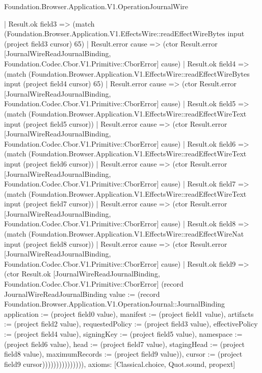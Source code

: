 \begin{lexlean}{Foundation.Browser.Application.V1.OperationJournalWire}
\begin{semanticmodule}
{              | Result.ok field3 => (match (Foundation.Browser.Application.V1.EffectsWire::readEffectWireBytes input (project field3 cursor) 65)
                | Result.error cause => (ctor Result.error [JournalWireReadJournalBinding, Foundation.Codec.Cbor.V1.Primitive::CborError] cause)
                | Result.ok field4 => (match (Foundation.Browser.Application.V1.EffectsWire::readEffectWireBytes input (project field4 cursor) 65)
                  | Result.error cause => (ctor Result.error [JournalWireReadJournalBinding, Foundation.Codec.Cbor.V1.Primitive::CborError] cause)
                  | Result.ok field5 => (match (Foundation.Browser.Application.V1.EffectsWire::readEffectWireText input (project field5 cursor))
                    | Result.error cause => (ctor Result.error [JournalWireReadJournalBinding, Foundation.Codec.Cbor.V1.Primitive::CborError] cause)
                    | Result.ok field6 => (match (Foundation.Browser.Application.V1.EffectsWire::readEffectWireText input (project field6 cursor))
                      | Result.error cause => (ctor Result.error [JournalWireReadJournalBinding, Foundation.Codec.Cbor.V1.Primitive::CborError] cause)
                      | Result.ok field7 => (match (Foundation.Browser.Application.V1.EffectsWire::readEffectWireText input (project field7 cursor))
                        | Result.error cause => (ctor Result.error [JournalWireReadJournalBinding, Foundation.Codec.Cbor.V1.Primitive::CborError] cause)
                        | Result.ok field8 => (match (Foundation.Browser.Application.V1.EffectsWire::readEffectWireNat input (project field8 cursor))
                          | Result.error cause => (ctor Result.error [JournalWireReadJournalBinding, Foundation.Codec.Cbor.V1.Primitive::CborError] cause)
                          | Result.ok field9 => (ctor Result.ok [JournalWireReadJournalBinding, Foundation.Codec.Cbor.V1.Primitive::CborError] (record JournalWireReadJournalBinding {value := (record Foundation.Browser.Application.V1.OperationJournal::JournalBinding {application := (project field0 value), manifest := (project field1 value), artifacts := (project field2 value), requestedPolicy := (project field3 value), effectivePolicy := (project field4 value), signingKey := (project field5 value), namespace := (project field6 value), head := (project field7 value), stagingHead := (project field8 value), maximumRecords := (project field9 value)}), cursor := (project field9 cursor)})))))))))))))),
  axioms: [Classical.choice, Quot.sound, propext]
}


\end{semanticmodule}
\end{lexlean}
